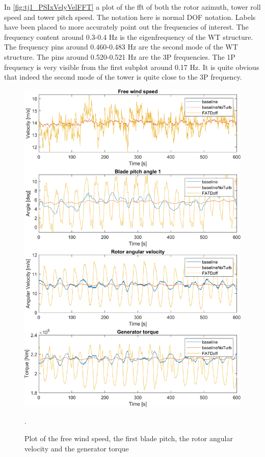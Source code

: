 In \cref{fig:tj1_PSIxVelyVelFFT} a plot of the fft of both the rotor azimuth, tower roll speed and tower pitch speed. The notation here is normal DOF notation. Labels have been placed to more accurately point out the frequencies of interest. The frequency content around 0.3-0.4 Hz is the eigenfrequency of the WT structure. The frequency pins around 0.460-0.483 Hz are the second mode of the WT structure. The pins around 0.520-0.521 Hz are the 3P frequencies. The 1P frequency is very visible from the first subplot around 0.17 Hz. It is quite obvious that indeed the second mode of the tower is quite close to the 3P frequency. 

\begin{figure}[h]
	\centering
	\includegraphics[width=0.8\linewidth]{Graphics/TestResults/tj01/VfreeToMgen.png}
	\caption{Plot of the free wind speed, the first blade pitch, the rotor angular velocity and the generator torque}.
	\label{fig:tj1:vfreetomgen}
\end{figure}

